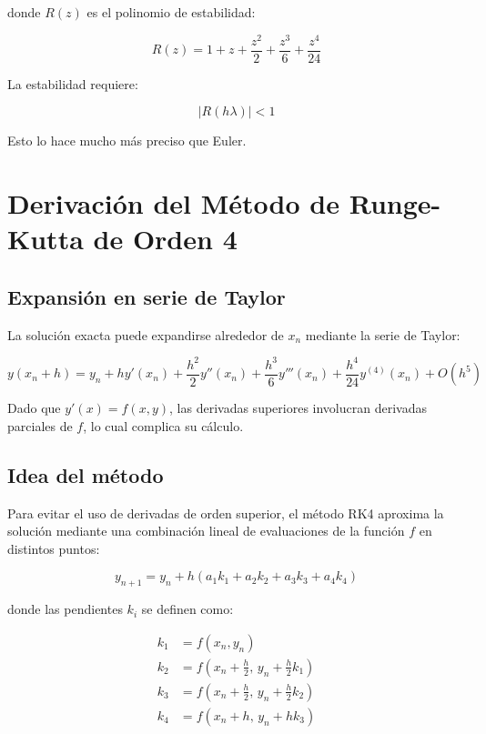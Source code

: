 \documentclass[12pt,a4paper]{article}
\begin{document}
donde $R(z)$ es el polinomio de estabilidad:

\begin{equation}
R(z) = 1 + z + \frac{z^2}{2} + \frac{z^3}{6} + \frac{z^4}{24}
\end{equation}

La estabilidad requiere:

\begin{equation}
|R(h\lambda)| < 1
\end{equation}



Esto lo hace mucho más preciso que Euler.

\section{Derivación del Método de Runge-Kutta de Orden 4}

\subsection{Expansión en serie de Taylor}

La solución exacta puede expandirse alrededor de $x_n$ mediante la serie de Taylor:

\begin{equation}
y(x_n + h) = y_n + h y'(x_n) + \frac{h^2}{2} y''(x_n) + \frac{h^3}{6} y'''(x_n) + \frac{h^4}{24} y^{(4)}(x_n) + O(h^5)
\end{equation}

Dado que $y'(x) = f(x,y)$, las derivadas superiores involucran derivadas parciales de $f$, lo cual complica su cálculo.

\subsection{Idea del método}

Para evitar el uso de derivadas de orden superior, el método RK4 aproxima la solución mediante una combinación lineal de evaluaciones de la función $f$ en distintos puntos:

\begin{equation}
y_{n+1} = y_n + h \left(a_1 k_1 + a_2 k_2 + a_3 k_3 + a_4 k_4\right)
\end{equation}

donde las pendientes $k_i$ se definen como:

\begin{align}
k_1 &= f(x_n, y_n) \\
k_2 &= f\left(x_n + \frac{h}{2}, \, y_n + \frac{h}{2}k_1\right) \\
k_3 &= f\left(x_n + \frac{h}{2}, \, y_n + \frac{h}{2}k_2\right) \\
k_4 &= f(x_n + h, \, y_n + h k_3)
\end{align}
\end{document}
